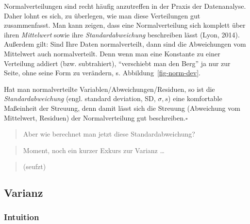 \documentclass[
  letterpaper,
]{scrbook}
\theoremstyle{definition}
\theoremstyle{definition}
\theoremstyle{definition}
\theoremstyle{remark}
\begin{document}
Normalverteilungen sind recht häufig anzutreffen in der Praxis der
Datenanalyse. Daher lohnt es sich, zu überlegen, wie man diese
Verteilungen gut zusammenfasst. Man kann zeigen, dass eine
Normalverteilung sich komplett über ihren \emph{Mittelwert} sowie ihre
\emph{Standardabweichung} beschreiben lässt (Lyon, 2014). Außerdem gilt:
Sind Ihre Daten normalverteilt, dann sind die Abweichungen vom
Mittelwert auch normalverteilt. Denn wenn man eine Konstante zu einer
Verteilung addiert (bzw. subtrahiert), ``verschiebt man den Berg'' ja
nur zur Seite, ohne seine Form zu verändern, s.
Abbildung~\ref{fig-norm-dev}.

\begin{tcolorbox}[enhanced jigsaw, left=2mm, toptitle=1mm, toprule=.15mm, rightrule=.15mm, leftrule=.75mm, breakable, colbacktitle=quarto-callout-note-color!10!white, colback=white, coltitle=black, bottomtitle=1mm, opacityback=0, title=\textcolor{quarto-callout-note-color}{\faInfo}\hspace{0.5em}{Hinweis}, colframe=quarto-callout-note-color-frame, arc=.35mm, opacitybacktitle=0.6, bottomrule=.15mm, titlerule=0mm]

Hat man normalverteilte Variablen/Abweichungen/Residuen, so ist die
\emph{Standardabweichung} (engl. standard deviation, SD, \(\sigma, s\))
eine komfortable Maßeinheit der Streuung, denn damit lässt sich die
Streuung (Abweichung vom Mittelwert, Residuen) der Normalverteilung gut
beschreiben.\(\square\)

\end{tcolorbox}

\begin{quote}
{} Aber wie berechnet man jetzt diese Standardabweichung?
\end{quote}

\begin{quote}
{} Moment, noch ein kurzer Exkurs zur Varianz \ldots{}
\end{quote}

\begin{quote}
{} (seufzt)
\end{quote}

\subsection{Varianz}\label{varianz}

\subsubsection{Intuition}\label{intuition}
\end{document}
